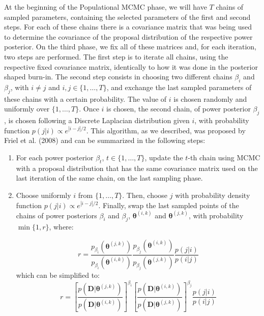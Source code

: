 At the beginning of the Populational MCMC phase, we will have $T$ chains of 
sampled parameters, containing the selected parameters of the first and 
second steps. For each of these chains there is a covariance matrix that 
was being used to determine the covariance of the proposal distribution 
of the respective power posterior. On the third phase, we fix all of 
these matrices and, for each iteration, two steps are performed. The 
first step is to iterate all chains, using the respective fixed 
covariance matrix, identically to how it was done in the posterior
shaped burn-in. The second step consists in choosing two different
chains $\beta_i$ and $\beta_j$, with $i \neq j$ and $i, j \in \{1,
\ldots, T\}$, and exchange the last sampled parameters of these chains
with a certain probability. The value of $i$ is chosen randomly and
uniformly over $\{1, \ldots, T\}$. Once $i$ is chosen, the second chain,
of power posterior $\beta_j$, is chosen following a Discrete Laplacian
distribution given $i$, with probability function $p (j | i) \propto
e^{|i - j| / 2}$. This algorithm, as we described, was proposed by Friel
et al. (2008) and can  be summarized in the following steps:
\begin{enumerate}
    \item{For each power posterior $\beta_t$, $t \in \{1, \ldots, T\}$, 
        update the $t$-th chain using MCMC with a proposal distribution
        that has the same covariance matrix used on the last iteration
        of the same chain, on the last sampling phase.}
    \item{Choose uniformly $i$ from $\{1, \ldots, T\}$. Then, choose
        $j$ with probability density function $p (j | i) \propto 
        e^{|i - j| / 2}$. Finally, swap the last sampled points of 
        the chains of power posteriors $\beta_i$ and $\beta_j$, 
        ${\bm \theta}^{(i, k)}$ and ${\bm \theta}^{(j, k)}$, with 
        probability $\min\{1, r\}$, where: }

    \begin{equation}
        r = \frac{p_{\beta_i}\left({\bm \theta}^{(j, k)}\right)}
             {p_{\beta_i}\left({\bm \theta}^{(i, k)}\right)}
        \frac{p_{\beta_j}\left({\bm \theta}^{(i, k)}\right)}
             {p_{\beta_j}\left({\bm \theta}^{(j, k)}\right)}
        \frac{p (j | i)}
             {p (i | j)}
    \end{equation}
    which can be simplified to:
    \begin{equation}
        r = \left[\frac{p \left({\bm D} | {\bm \theta}^{(j, k)}\right)}
                {p \left({\bm D} | {\bm \theta}^{(i,
                k)}\right)}\right]^{\beta_i}
            \left[\frac{p \left({\bm D} | {\bm \theta}^{(i, k)}\right)}
                {p \left({\bm D} | {\bm \theta}^{(j,
                k)}\right)}\right]^{\beta_j}
            \frac{p (j | i)}
                 {p (i | j)}
    \end{equation}
\end{enumerate}

